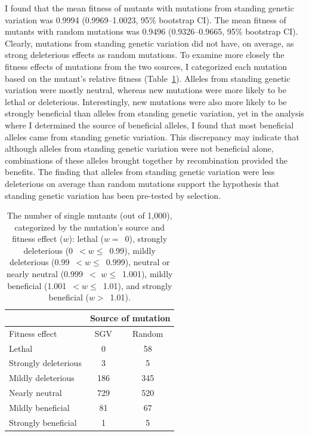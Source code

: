 \begin{doublespace}
I found that the mean fitness of mutants
with mutations from standing genetic variation
was 0.9994 (0.9969--1.0023, 95\% bootstrap CI).
%
The mean fitness of mutants with random mutations
was 0.9496 (0.9326--0.9665, 95\% bootstrap CI).
%
Clearly, mutations from standing genetic variation
did not have, on average, as strong deleterious effects
as random mutations.
%
To examine more closely the fitness effects
of mutations from the two sources,
I categorized each mutation based on
the mutant's relative fitness (Table~\ref{mutant_fitness_table}).
%
Alleles from standing genetic variation were mostly neutral,
whereas new mutations were more likely to be lethal or deleterious.
%
Interestingly, new mutations were also more likely
to be strongly beneficial than alleles from standing genetic variation,
yet in the analysis where I determined the source of beneficial alleles,
I found that most beneficial alleles came from standing genetic variation.
%
This discrepancy may indicate that although alleles
from standing genetic variation were not beneficial alone,
combinations of these alleles brought together
by recombination provided the benefits.
%
The finding that alleles from standing genetic variation
were less deleterious on average than random mutations
support the hypothesis that standing genetic variation
has been pre-tested by selection.



\begin{table}
\begin{center}
\begin{tabular}{lcc}
\cline{2-3}
\multicolumn{1}{l}{} & \multicolumn{2}{c}{Source of mutation} \\
\hline
Fitness effect & SGV & Random \\
\hline
Lethal & 0 & 58 \\
Strongly deleterious & 3 & 5 \\
Mildly deleterious & 186 & 345 \\
Nearly neutral & 729 & 520 \\
Mildly beneficial & 81 & 67 \\
Strongly beneficial & 1 & 5 \\
\hline
\end{tabular}
\caption{The number of single mutants (out of 1,000),
  categorized by the mutation's source and fitness effect ($w$):
  lethal ($w =$~0),
  strongly deleterious (0~$< w \le$~0.99),
  mildly deleterious (0.99~$< w \le$~0.999),
  neutral or nearly neutral (0.999~$<$ $w \le$~1.001),
  mildly beneficial (1.001~$< w \le$~1.01),
  and strongly beneficial ($w >$~1.01).}
\label{mutant_fitness_table}
\end{center}
\end{table}




\end{doublespace}
